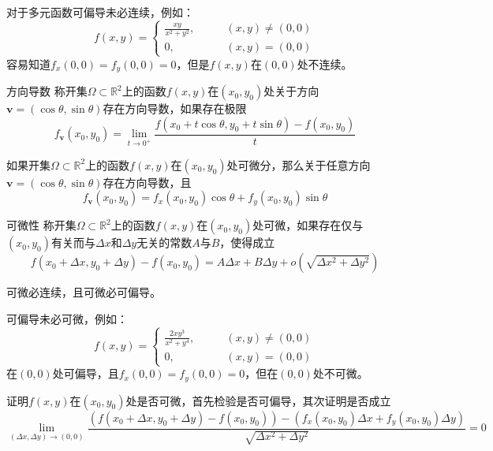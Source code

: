 \documentclass[lang = cn, scheme = chinese, thmcnt = section]{elegantbook}
\newcommand{\R}{\mathbb{R}}            %
\newcommand{\sub}{\subset}             %
\newcommand{\bs}{\boldsymbol}          %
\begin{document}
\begin{note}
	对于多元函数可偏导未必连续，例如：
	$$
	f(x,y)=\begin{cases}
		\frac{xy}{x^2+y^2},\qquad & (x,y)\ne (0,0)\\
		0,\qquad & (x,y)=(0,0)
	\end{cases}
	$$
	容易知道$f_x(0,0)=f_y(0,0)=0$，但是$f(x,y)$在$(0,0)$处不连续。
\end{note}

\begin{definition}{方向导数}
	称开集$\Omega\sub\R^2$上的函数$f(x,y)$在$(x_0,y_0)$处关于方向$\bs{v}=(\cos\theta,\sin\theta)$存在方向导数，如果存在极限
	$$
	f_{\bs{v}}(x_0,y_0)
	=\lim_{t\to 0^+}\frac{f(x_0+t\cos\theta,y_0+t\sin\theta)-f(x_0,y_0)}{t}
	$$
\end{definition}

\begin{theorem}
	如果开集$\Omega\sub\R^2$上的函数$f(x,y)$在$(x_0,y_0)$处可微分，那么关于任意方向$\bs{v}=(\cos\theta,\sin\theta)$存在方向导数，且
	$$
	f_{\bs{v}}(x_0,y_0)
	=f_x(x_0,y_0)\cos\theta+f_y(x_0,y_0)\sin\theta
	$$
\end{theorem}

\begin{definition}{可微性}
	称开集$\Omega\sub\R^2$上的函数$f(x,y)$在$(x_0,y_0)$处可微，如果存在仅与$(x_0,y_0)$有关而与$\Delta x$和$\Delta y$无关的常数$A$与$B$，使得成立
	$$
	f(x_0+\Delta x,y_0+\Delta y)-f(x_0,y_0)
	=A\Delta x+B\Delta y+o(\sqrt{\Delta x^2+\Delta y^2})
	$$
\end{definition}

\begin{note}
	可微必连续，且可微必可偏导。
\end{note}

\begin{note}
	可偏导未必可微，例如：
	$$
	f(x,y)=\begin{cases}
		\frac{2xy^3}{x^2+y^4},\qquad & (x,y)\ne (0,0)\\
		0,\qquad & (x,y)=(0,0)
	\end{cases}
	$$
	在$(0,0)$处可偏导，且$f_x(0,0)=f_y(0,0)=0$，但在$(0,0)$处不可微。
\end{note}

\begin{note}
	证明$f(x,y)$在$(x_0,y_0)$处是否可微，首先检验是否可偏导，其次证明是否成立
	$$
	\lim_{(\Delta x,\Delta y)\to (0,0)}\frac{(f(x_0+\Delta x,y_0+\Delta y)-f(x_0,y_0))-(f_x(x_0,y_0)\Delta x+f_y(x_0,y_0)\Delta y)}{\sqrt{\Delta x^2+\Delta y^2}}=0
	$$
\end{note}
\end{document}
